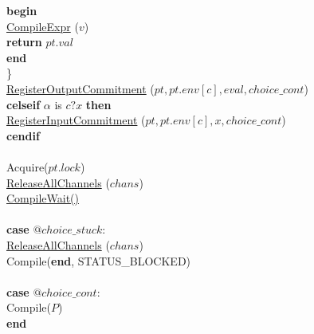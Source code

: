 \documentclass[a4paper,11pt]{article}
\newenvironment{program}{
  \begin{sffamily}
  \begin{scriptsize}
  \begin{tabbing}}
 {\end{tabbing}
  \end{scriptsize}
  \end{sffamily}}
\newcommand{\kw}[1]{\textsf{\textbf{#1}}}
\newcommand{\pindent}{\hspace{2em}\=}
\newcommand{\compiletime}[1]{\textcolor{compilecolor}{#1}}
\newcommand{\synchro}[1]{\textcolor{synchrocolor}{#1}}
\newcommand{\myref}[1]{
  \hyperref[#1]{#1}
}
\begin{document}
\begin{program}
  \>\>\pindent\kw{begin} \\
  \>\>\>\pindent\compiletime{\myref{CompileExpr}($v$)} \\
  \>\>\>\>\kw{return} $pt.val$ \\
  \>\>\>\kw{end} \\
  \>\>\} \\
  \>\>\myref{RegisterOutputCommitment}($pt, pt.env[c], eval, choice\_cont$) \\
  \>\compiletime{\kw{celseif} $\alpha$ is $c?x$ \kw{then}} \\
  \>\>\myref{RegisterInputCommitment}($pt, pt.env[c], x, choice\_cont$) \\
  \>\compiletime{\kw{cendif}} \\
  \>\\
  \>\synchro{Acquire($pt.lock$)} \\
  \>\synchro{\myref{ReleaseAllChannels}($chans$)} \\
  \>\compiletime{\myref{CompileWait()}} \\
  \>\\
  \> \kw{case} $@choice\_stuck:$ \\
  \>\>\synchro{\myref{ReleaseAllChannels}($chans$)} \\
  \>\>\compiletime{Compile(\kw{end}, STATUS\_BLOCKED)} \\
  \>\\
  \>\kw{case} $@choice\_cont:$ \\
  \>\>\compiletime{Compile($P$)} \\
  \kw{end}
\end{program}
\end{document}
